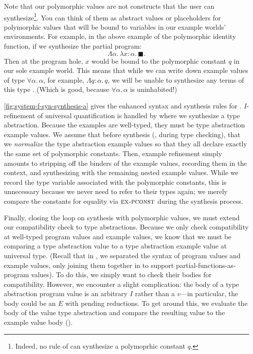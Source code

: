 Note that our polymorphic values are not constructs that the user can synthesize\footnote{%
  Indeed, no rule of \systemfsyn{} can synthesize a polymoprhic constant $q$.
}.
You can think of them as abstract values or placeholders for polymorphic values that will be bound to variables in our example worlds' environments.
For example, in the above example of the polymorphic identity function, if we synthesize the partial program:
\[
  Λα.\,λx{:}α.\,◼.
\]
Then at the program hole, $x$ would be bound to the polymorphic constant $q$ in our sole example world.
This means that while we can write down example values of type $∀α.\,α$, for example, $Λq:α.\,q$, we will be unable to synthesize any terms of this type .
(Which is good, because $∀α.\,α$ is uninhabited!)



\autoref{fig:system-f-syn-synthesis-a} gives the enhanced syntax and synthesis rules for \systemfsyn{}.
$I$-refinement of universal quantification is handled by  where we synthesize a type abstraction.
Because the examples are well-typed, they must be type abstraction example values.
We assume that before synthesis (\eg, during type checking), that we \emph{normalize} the type abstraction example values so that they all declare exactly the same set of polymorphic constants.
Then, example refinement simply amounts to stripping off the binders of the example values, recording them in the context, and synthesizing with the remaining nested example values.
While we record the type variable associated with the polymorphic constants, this is unnecessary because we never need to refer to their types again; we merely compare the constants for equality via $\textsc{ex-pconst}$ during the synthesis process.

Finally, closing the loop on synthesis with polymorphic values, we must extend our compatibility check to type abstractions.
Because we only check compatibility at well-typed program values and example values, we know that we must be comparing a type abstraction value to a type abstraction example value at universal type.
(Recall that in \lsyn{}, we separated the syntax of program values and example values, only joining them together in \mlsyn{} to support partial-functions-as-program values).
To do this, we simply want to check their bodies for compatibility.
However, we encounter a slight complication: the body of a type abstraction program value is an arbitrary $I$ rather than a $v$---in particular, the body could be an $E$ with pending reductions.
To get around this, we evaluate the body of the value type abstraction and compare the resulting value to the example value body ().

